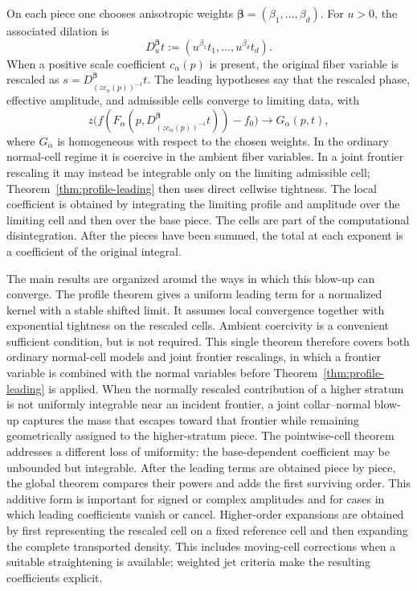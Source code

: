 \documentclass[11pt]{amsart}
\numberwithin{equation}{section}
\theoremstyle{definition}
\theoremstyle{remark}
\begin{document}
On each piece one chooses anisotropic weights
$\bm\beta=(\beta_1,\ldots,\beta_d)$.  For $u>0$, the associated dilation is
\begin{equation*}
  D_u^{\bm\beta}t
  :=(u^{\beta_1}t_1,\ldots,u^{\beta_d}t_d).
\end{equation*}
When a positive scale coefficient $c_\alpha(p)$ is present, the original
fiber variable is rescaled as
$s=D_{(zc_\alpha(p))^{-1}}^{\bm\beta}t$.  The leading hypotheses say that the
rescaled phase, effective amplitude, and admissible cells converge to limiting
data, with
\begin{equation*}
  z\bigl(f(F_\alpha(p,D_{(zc_\alpha(p))^{-1}}^{\bm\beta}t))-f_0\bigr)
  \longrightarrow G_\alpha(p,t),
\end{equation*}
where $G_\alpha$ is homogeneous with respect to the chosen weights.  In the
ordinary normal-cell regime it is coercive in the ambient fiber variables.  In
a joint frontier rescaling it may instead be integrable only on the limiting
admissible cell; Theorem~\ref{thm:profile-leading} then uses direct
cellwise tightness.  The local coefficient is obtained by integrating the limiting profile and
amplitude over the limiting cell and then over the base piece.  The cells are
part of the computational disintegration.  After the pieces have been summed,
the total at each exponent is a coefficient of the original integral.

The main results are organized around the ways in which this blow-up can
converge.  The profile theorem gives a uniform leading term for a normalized
kernel with a stable shifted limit.  It assumes local convergence together with
exponential tightness on the rescaled cells.  Ambient coercivity is a convenient
sufficient condition, but is not required.  This single theorem therefore
covers both ordinary normal-cell models and joint frontier rescalings, in which
a frontier variable is combined with the normal variables before
Theorem~\ref{thm:profile-leading} is applied.  When the normally rescaled
contribution of a higher stratum is not uniformly integrable near an incident
frontier, a joint collar--normal blow-up captures the mass that escapes toward
that frontier while remaining geometrically assigned to the higher-stratum
piece.  The pointwise-cell
theorem addresses a different loss of uniformity:
the base-dependent coefficient may be unbounded but integrable.  After the
leading terms are obtained piece by piece, the global theorem compares their
powers and adds the first surviving order.  This additive form is important for
signed or complex amplitudes and for cases in which leading coefficients vanish
or cancel.  Higher-order expansions are obtained by first representing the
rescaled cell on a fixed reference cell and then expanding the complete
transported density.  This includes moving-cell corrections when a suitable
straightening is available; weighted jet criteria make the resulting
coefficients explicit.
\end{document}
